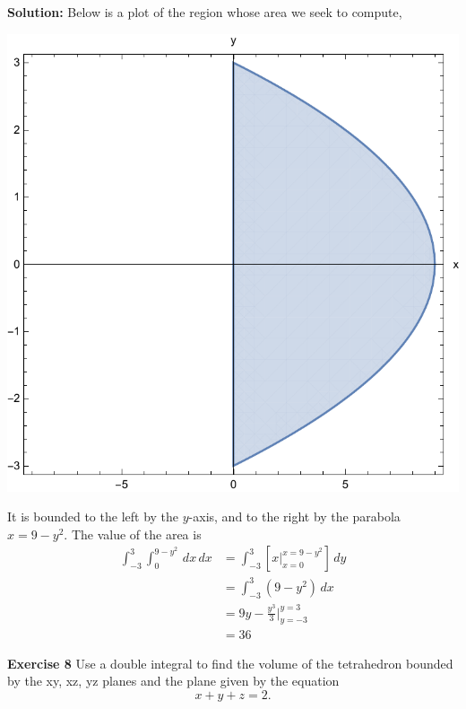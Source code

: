 \documentclass[12pt,oneside]{exam}
\newenvironment{exercise}[1]{\vspace{.1in}\noindent\textbf{Exercise #1 \hspace{.05em}}}{}
\newenvironment{newsolution}{\vspace{.1in}\noindent\textbf{Solution: \hspace{.05em}}}{}
\begin{document}
\begin{newsolution}
Below is a plot of the region whose area we seek to compute, 
\begin{center}
\includegraphics[scale=0.5]{p7.pdf}
\end{center}
It is bounded to the left by the $y$-axis, and to the right by the parabola $x=9-y^2$. The value of the area is
\begin{align*}
\int_{-3}^{3} \int_{0}^{9-y^2} \, dx\, dx & = \int_{-3}^{3}\left[ x \Big|_{x=0}^{x=9-y^2} \right] \, dy \\
& = \int_{-3}^{3} (9-y^2) \, dx \\
& = 9y-\frac{y^3}{3} \Big|_{y=-3}^{y=3}\\
& = 36
\end{align*}
\end{newsolution}

\begin{exercise}{8}
Use a double integral to find the volume of the tetrahedron bounded by the xy, xz, yz planes and the plane given by the equation 
\begin{equation*}
x+y+z=2.
\end{equation*}
\end{exercise}
\end{document}
